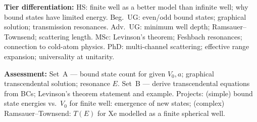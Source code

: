\documentclass[11pt,a4paper]{article}
\begin{document}
\begin{tcolorbox}[modulebox, title={Module~I.4 / L11: Scattering from a Potential Well}]
\medskip\textbf{Tier differentiation:}
HS: finite well as a better model than infinite well; why bound states have limited energy.
Beg.\ UG: even/odd bound states; graphical solution; transmission resonances.
Adv.\ UG: minimum well depth; Ramsauer--Townsend; scattering length.
MSc: Levinson's theorem; Feshbach resonances; connection to cold-atom physics.
PhD: multi-channel scattering; effective range expansion; universality at unitarity.

\medskip\textbf{Assessment:}
Set~A --- bound state count for given $V_0,a$; graphical transcendental solution; resonance $E$.
Set~B --- derive transcendental equations from BCs; Levinson's theorem statement and example.
Projects: (simple) bound state energies vs.\ $V_0$ for finite well: emergence of new states;
(complex) Ramsauer--Townsend: $T(E)$ for Xe modelled as a finite spherical well.
\end{tcolorbox}

\medskip
\end{document}
